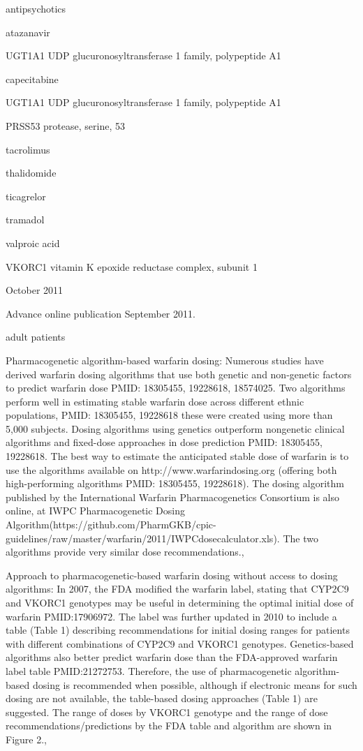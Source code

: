 \documentclass{resume} %
\begin{document}
\begin{rSection}{ antipsychotics }
\begin{rSection}{ atazanavir }
\begin{rSubsection}{ UGT1A1 }{ UDP glucuronosyltransferase 1 family, polypeptide A1 }{}{}
\begin{rSection}{ capecitabine }
\begin{rSubsection}{ UGT1A1 }{ UDP glucuronosyltransferase 1 family, polypeptide A1 }{}{}
\begin{rSubsection}{ PRSS53 }{ protease, serine, 53 }{}{}
\begin{rSection}{ tacrolimus }
\begin{rSection}{ thalidomide }
\begin{rSection}{ ticagrelor }
\begin{rSection}{ tramadol }
\begin{rSection}{ valproic acid }
\begin{rSubsection}{ VKORC1 }{ vitamin K epoxide reductase complex, subunit 1 }{}{}
\item October 2011
 \newline
\item Advance online publication September 2011. 
 \newline
\item adult patients
 \newline
\item Pharmacogenetic algorithm-based warfarin dosing: Numerous studies have derived warfarin dosing algorithms that use both genetic and non-genetic factors to predict warfarin dose PMID: 18305455, 19228618, 18574025. Two algorithms perform well in estimating stable warfarin dose across different ethnic populations,  PMID: 18305455, 19228618 these were created using more than 5,000 subjects. Dosing algorithms using genetics outperform nongenetic clinical algorithms and fixed-dose approaches in dose prediction PMID: 18305455, 19228618. The best way to estimate the anticipated stable dose of warfarin is to use the algorithms available on http://www.warfarindosing.org (offering both high-performing algorithms PMID: 18305455, 19228618). The dosing algorithm published by the International Warfarin Pharmacogenetics Consortium is also online, at IWPC Pharmacogenetic Dosing Algorithm(https://github.com/PharmGKB/cpic-guidelines/raw/master/warfarin/2011/IWPCdosecalculator.xls). The two algorithms provide very similar dose recommendations., 
 \newline
\item Approach to pharmacogenetic-based warfarin dosing without access to dosing algorithms:     In 2007, the FDA modified the warfarin label, stating that CYP2C9 and VKORC1 genotypes may be useful in determining the optimal initial dose of warfarin PMID:17906972. The label was further updated in 2010 to include a table (Table 1) describing recommendations for initial dosing ranges for patients with different combinations of CYP2C9 and VKORC1 genotypes. Genetics-based algorithms also better predict warfarin dose than the FDA-approved warfarin label table PMID:21272753. Therefore, the use of pharmacogenetic algorithm-based dosing is recommended when possible, although if electronic means for such dosing are not available, the table-based dosing approaches (Table 1) are suggested. The range of doses by VKORC1 genotype and the range of dose recommendations/predictions by the FDA table and algorithm are shown in Figure 2., 
 \newline

\end{rSubsection}
\end{rSection}
\end{rSection}
\end{rSection}
\end{rSection}
\end{rSection}
\end{rSubsection}
\end{rSubsection}
\end{rSection}
\end{rSubsection}
\end{rSection}
\end{rSection}
\end{document}

